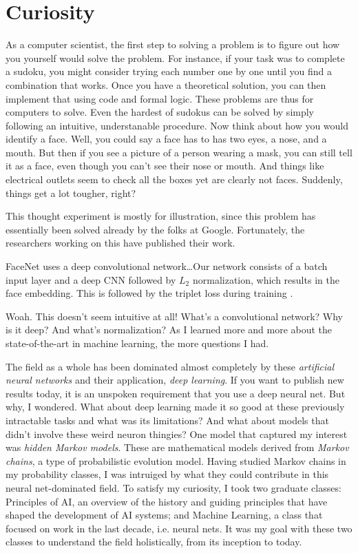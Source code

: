 \documentclass[12pt, titlepage]{article}
\newenvironment{myindentpar}[1]
  {\begin{list}{}
          {
            \setlength{\leftmargin}{#1}
            \setlength{\rightmargin}{#1}
          }
          \item[]
  }
  {\end{list}}
\begin{document}
\section{Curiosity}
As a computer scientist, the first step to solving a problem is to figure out how you yourself would solve the problem. For instance, if your task was to complete a sudoku, you might consider trying each number one by one until you find a combination that works. Once you have a theoretical solution, you can then implement that using code and formal logic. These problems are thus  for computers to solve. Even the hardest of sudokus can be solved by simply following an intuitive, understanable procedure. Now think about how you would identify a face. Well, you could say a face has to has two eyes, a nose, and a mouth. But then if you see a picture of a person wearing a mask, you can still tell it as a face, even though you can't see their nose or mouth. And things like electrical outlets seem to check all the boxes yet are clearly not faces. Suddenly, things get a lot tougher, right?

This thought experiment is mostly for illustration, since this problem has essentially been solved already by the folks at Google. Fortunately, the researchers working on this have published their work.
\begin{myindentpar}{1em}
FaceNet uses a deep convolutional network\ldots Our network consists of a batch input layer and a deep CNN followed by $L_2$ normalization, which results in the face embedding. This is followed by the triplet loss during training \cite{SchroffKP15}.
\end{myindentpar}
Woah. This doesn't seem intuitive at all! What's a convolutional network? Why is it deep? And what's normalization? As I learned more and more about the state-of-the-art in machine learning, the more questions I had.

The field as a whole has been dominated almost completely by these \textit{artificial neural networks} and their application, \textit{deep learning}. If you want to publish new results today, it is an unspoken requirement that you use a deep neural net. But why, I wondered. What about deep learning made it so good at these previously intractable tasks and what was its limitations? And what about models that didn't involve these weird neuron thingies? One model that captured my interest was \textit{hidden Markov models}. These are mathematical models derived from \textit{Markov chains}, a type of probabilistic evolution model. Having studied Markov chains in my probability classes, I was intruiged by what they could contribute in this neural net-dominated field. To satisfy my curiosity, I took two graduate classes: Principles of AI, an overview of the history and guiding principles that have shaped the development of AI systems; and Machine Learning, a class that focused on work in the last decade, i.e. neural nets. It was my goal with these two classes to understand the field holistically, from its inception to today.
\end{document}
